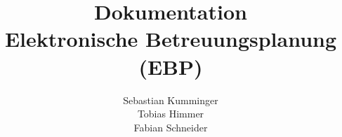 \documentclass[a4paper,12pt]{article}
\title{Dokumentation\\Elektronische Betreuungsplanung\\(EBP)}
\author{Sebastian Kumminger \\
	Tobias Himmer \\
	Fabian Schneider}
\begin{document}
\maketitle

\newpage

\tableofcontents

\newpage

\listoffigures


\newpage



\newpage



\newpage



\newpage



\newpage

\begin{appendix} 



\end{appendix}

\newpage
 


\end{document}
